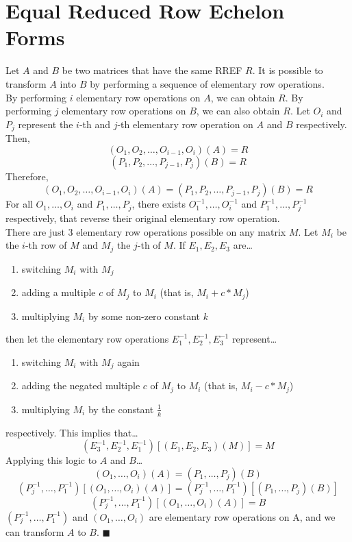 \documentclass[11pt]{article}
\begin{document}
\section{Equal Reduced Row Echelon Forms}
Let \(A\) and \(B\) be two matrices that have the same RREF \(R\). It is possible to transform \(A\) into \(B\) by performing a sequence of elementary row operations.\\[10pt]
By performing \(i\) elementary row operations on \(A\), we can obtain \(R\). By performing \(j\) elementary row operations on \(B\), we can also obtain \(R\). Let \(O_i\) and \(P_j\) represent the \(i\)-th and \(j\)-th elementary row operation on \(A\) and \(B\) respectively. Then,
\[
    (O_1, O_2, \ldots, O_{i - 1}, O_{i})(A) = R
\]
\[
    (P_1, P_2, \ldots, P_{j - 1}, P_{j})(B) = R
\]
Therefore,
\[
    (O_1, O_2, \ldots, O_{i - 1}, O_{i})(A) = (P_1, P_2, \ldots, P_{j - 1}, P_{j})(B) = R
\]
For all \(O_1, \ldots, O_i\) and \(P_1, \ldots, P_j\), there exists \(O_1^{-1}, \ldots, O_i^{-1}\) and \(P_1^{-1}, \ldots, P_j^{-1}\) respectively, that reverse their original elementary row operation.\\[10pt]
There are just 3 elementary row operations possible on any matrix \(M\). Let \(M_i\) be the \(i\)-th row of \(M\) and \(M_j\) the \(j\)-th of \(M\). If \(E_1, E_2, E_3\) are\dots
\begin{enumerate}
    \item switching \(M_i\) with \(M_j\)
    \item adding a multiple \(c\) of \(M_j\) to \(M_i\) (that is, \(M_i + c * M_j\))
    \item multiplying \(M_i\) by some non-zero constant \(k\)
\end{enumerate}
then let the elementary row operations \(E_1^{-1}, E_2^{-1}, E_3^{-1}\) represent\dots
\begin{enumerate}
    \item switching \(M_i\) with \(M_j\) again
    \item adding the negated multiple \(c\) of \(M_j\) to \(M_i\) (that is, \(M_i - c * M_j\))
    \item multiplying \(M_i\) by the constant \(\frac{1}{k}\)
\end{enumerate}
respectively. This implies that\dots
\[
    (E_3^{-1}, E_2^{-1}, E_1^{-1})[(E_1, E_2, E_3)(M)] = M
\]
Applying this logic to \(A\) and \(B\)\dots
\[
    (O_1, \ldots, O_{i})(A) = (P_1, \ldots, P_{j})(B)
\]
\[
    (P_j^{-1}, \ldots, P_{1}^{-1})[(O_1, \ldots, O_{i})(A)] = (P_j^{-1}, \ldots, P_{1}^{-1})[(P_1, \ldots, P_{j})(B)]
\]
\[
    (P_j^{-1}, \ldots, P_1^{-1})[(O_1, \ldots, O_{i})(A)] = B
\]
\((P_j^{-1}, \ldots, P_{1}^{-1})\) and \((O_1, \ldots, O_{i})\) are elementary row operations on A, and we can transform \(A\) to \(B\). $\blacksquare$
\end{document}
